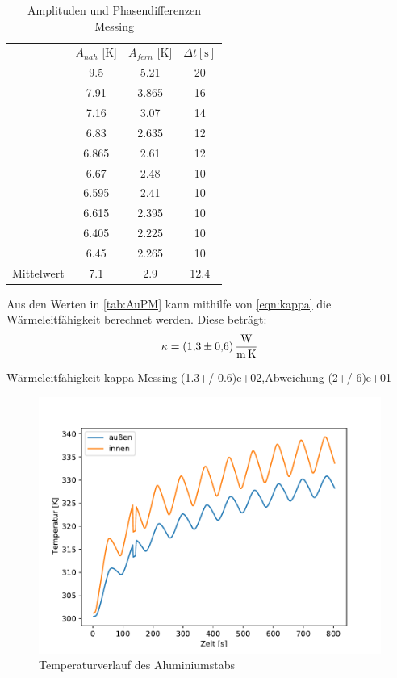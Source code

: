 	
\begin{table}[H]
	\centering
	\caption{Amplituden und Phasendifferenzen Messing}
	\label{tab:AuPM}
	\begin{tabular}{l S S S[table-format=2.0]}
		\toprule
		&{$A_{nah}$ [K]} & {$A_{fern}$ [K]} &{$\Delta t [\si{\second}]$}\\
		\cmidrule(lr) {2-4}
		&9.5&5.21&20\\
    &7.91&3.865&16\\
    &7.16&3.07&14\\
    &6.83&2.635&12\\
    &6.865&2.61&12\\
    &6.67&2.48&10\\
    &6.595&2.41&10\\
    &6.615&2.395&10\\
    &6.405&2.225&10\\
    &6.45&2.265&10\\
    \cmidrule(lr) {2-4}
    {Mittelwert}&7.1 &2.9 &12.4\\
		\bottomrule
	\end{tabular}
\end{table}	

Aus den Werten in \autoref{tab:AuPM} kann mithilfe von \autoref{eqn:kappa} die Wärmeleitfähigkeit berechnet werden.
Diese beträgt:
\begin{equation*}
  \kappa=\qty{1.3 +- 0.6}{\watt\per\meter\per\kelvin}
\end{equation*}


Wärmeleitfähigkeit kappa Messing (1.3+/-0.6)e+02,Abweichung (2+/-6)e+01


\begin{figure}[!htbp]
  \centering
  \includegraphics{content/dyn_80_alu.pdf}
  \caption{Temperaturverlauf des Aluminiumstabs}
  \label{fig:alu_dyn}
\end{figure}



